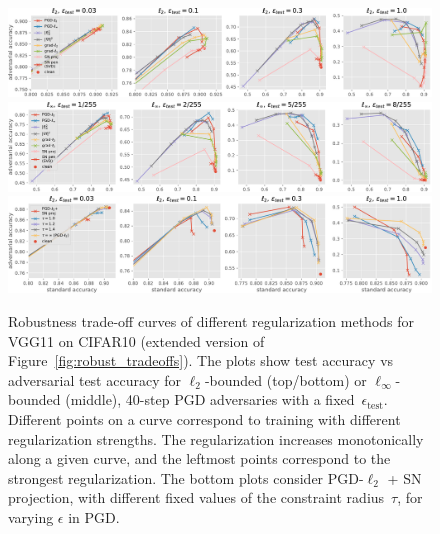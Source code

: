 \begin{figure}
	\centering
	\includegraphics[width=.9\textwidth]{figures/cifar10_vgg/test_vs_adv_l2.pdf}
	\includegraphics[width=.9\textwidth]{figures/cifar10_vgg/test_vs_adv_linf.pdf}
	\includegraphics[width=.9\textwidth]{figures/cifar10_vgg/test_vs_adv_comb.pdf}
	\caption{Robustness trade-off curves of different regularization methods for VGG11 on CIFAR10 (extended
	version of Figure~\ref{fig:robust_tradeoffs}).
	The plots show test accuracy vs adversarial test accuracy
	for $\ell_2$-bounded (top/bottom) or $\ell_\infty$-bounded (middle),
	40-step PGD adversaries with a fixed~$\epsilon_{\text{test}}$.
	Different points on a curve correspond to training with different regularization strengths.
	The regularization increases monotonically along a given curve, and
	the leftmost points correspond to the strongest regularization.
	The bottom plots consider PGD-$\ell_2$ + SN projection,
	with different fixed values of the constraint radius~$\tau$, for varying $\epsilon$ in PGD.}
	\label{fig:robust_tradeoffs_appx}
\end{figure}
